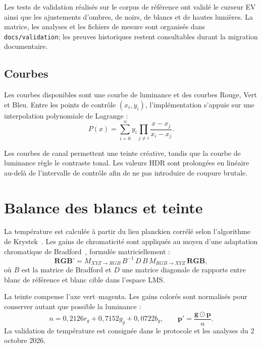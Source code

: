 Les tests de validation réalisés sur le corpus de référence ont validé le curseur EV ainsi que les ajustements d'ombres, de noirs, de blancs et de hautes lumières. La matrice, les analyses et les fichiers de mesure sont organisés dans \texttt{docs/validation}; les preuves historiques restent consultables durant la migration documentaire.

\subsection{Courbes}

Les courbes disponibles sont une courbe de luminance et des courbes Rouge, Vert et Bleu. Entre les points de contrôle $(x_i,y_i)$, l'implémentation s'appuie sur une interpolation polynomiale de Lagrange :
\begin{equation}
  P(x)=\sum_{i=0}^{n} y_i\prod_{j\ne i}\frac{x-x_j}{x_i-x_j}.
\end{equation}

Les courbes de canal permettent une teinte créative, tandis que la courbe de luminance règle le contraste tonal. Les valeurs HDR sont prolongées en linéaire au-delà de l'intervalle de contrôle afin de ne pas introduire de coupure brutale.

\section{Balance des blancs et teinte}

La température est calculée à partir du lieu planckien corrélé selon l'algorithme de Krystek~\cite{krystek1985}. Les gains de chromaticité sont appliqués au moyen d'une adaptation chromatique de Bradford~\cite{lam1985}, formulée matriciellement :
\begin{equation}
 \mathbf{RGB}' = M_{XYZ\rightarrow RGB}\,B^{-1}\,D\,B\,M_{RGB\rightarrow XYZ}\,\mathbf{RGB},
\end{equation}
où $B$ est la matrice de Bradford et $D$ une matrice diagonale de rapports entre blanc de référence et blanc cible dans l'espace LMS.

La teinte compense l'axe vert--magenta. Les gains colorés sont normalisés pour conserver autant que possible la luminance :
\begin{equation}
  n=0{,}2126r_g+0{,}7152g_g+0{,}0722b_g, \qquad \mathbf{p}'=\frac{\mathbf{g}\odot\mathbf{p}}{n}.
\end{equation}
La validation de température est consignée dans le protocole et les analyses du 2 octobre 2026.

